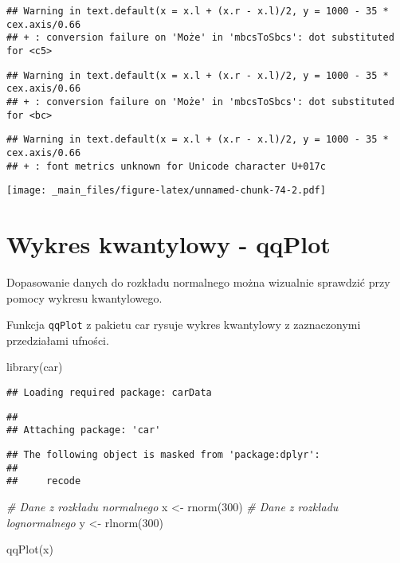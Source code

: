 \documentclass[
]{book}
\newenvironment{Shaded}{\begin{snugshade}}{\end{snugshade}}
\newcommand{\CommentTok}[1]{\textcolor[rgb]{0.56,0.35,0.01}{\textit{#1}}}
\newcommand{\DecValTok}[1]{\textcolor[rgb]{0.00,0.00,0.81}{#1}}
\newcommand{\FunctionTok}[1]{\textcolor[rgb]{0.00,0.00,0.00}{#1}}
\newcommand{\NormalTok}[1]{#1}
\newcommand{\OtherTok}[1]{\textcolor[rgb]{0.56,0.35,0.01}{#1}}
\begin{document}
\begin{verbatim}
## Warning in text.default(x = x.l + (x.r - x.l)/2, y = 1000 - 35 * cex.axis/0.66
## + : conversion failure on 'Może' in 'mbcsToSbcs': dot substituted for <c5>
\end{verbatim}

\begin{verbatim}
## Warning in text.default(x = x.l + (x.r - x.l)/2, y = 1000 - 35 * cex.axis/0.66
## + : conversion failure on 'Może' in 'mbcsToSbcs': dot substituted for <bc>
\end{verbatim}

\begin{verbatim}
## Warning in text.default(x = x.l + (x.r - x.l)/2, y = 1000 - 35 * cex.axis/0.66
## + : font metrics unknown for Unicode character U+017c
\end{verbatim}

\texttt{[image: \_main\_files/figure-latex/unnamed-chunk-74-2.pdf]}

\hypertarget{wykres-kwantylowy---qqplot}{%
\section{Wykres kwantylowy - qqPlot}\label{wykres-kwantylowy---qqplot}}

Dopasowanie danych do rozkładu normalnego można wizualnie sprawdzić przy pomocy wykresu kwantylowego.

Funkcja \texttt{qqPlot} z pakietu car rysuje wykres kwantylowy z zaznaczonymi przedziałami ufności.

\begin{Shaded}
\begin{Highlighting}[]
\FunctionTok{library}\NormalTok{(car)}
\end{Highlighting}
\end{Shaded}

\begin{verbatim}
## Loading required package: carData
\end{verbatim}

\begin{verbatim}
## 
## Attaching package: 'car'
\end{verbatim}

\begin{verbatim}
## The following object is masked from 'package:dplyr':
## 
##     recode
\end{verbatim}

\begin{Shaded}
\begin{Highlighting}[]
\CommentTok{\# Dane z rozkładu normalnego}
\NormalTok{x }\OtherTok{\textless{}{-}} \FunctionTok{rnorm}\NormalTok{(}\DecValTok{300}\NormalTok{)}
\CommentTok{\# Dane z rozkładu lognormalnego}
\NormalTok{y }\OtherTok{\textless{}{-}} \FunctionTok{rlnorm}\NormalTok{(}\DecValTok{300}\NormalTok{)}

\FunctionTok{qqPlot}\NormalTok{(x)}
\end{Highlighting}
\end{Shaded}
\end{document}
